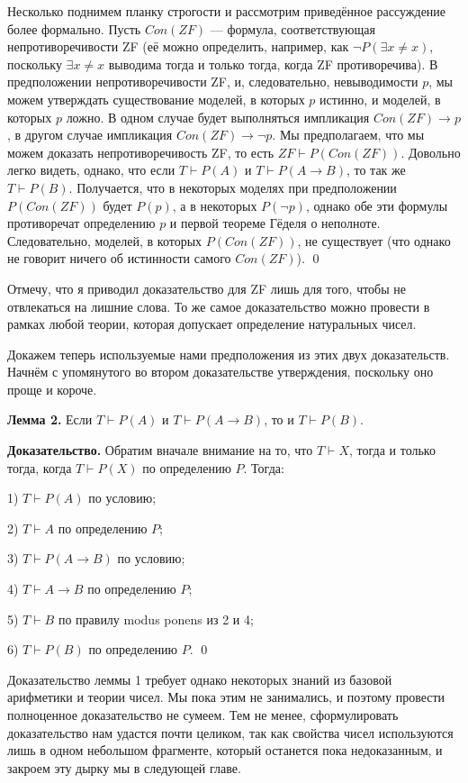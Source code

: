 Несколько поднимем планку строгости и рассмотрим приведённое рассуждение более формально. Пусть $Con(ZF)$ — формула, соответствующая непротиворечивости ZF (её можно определить, например, как $\neg P(\exists x\not=x)$, поскольку $\exists x \not= x$ выводима тогда и только тогда, когда ZF противоречива). В предположении непротиворечивости ZF, и, следовательно, невыводимости $p$, мы можем утверждать существование моделей, в которых $p$ истинно, и моделей, в которых $p$ ложно. В одном случае будет выполняться импликация $Con(ZF)\rightarrow p$, в другом случае импликация $Con(ZF)\rightarrow \neg p$. Мы предполагаем, что мы можем доказать непротиворечивость ZF, то есть $ZF\vdash P(Con(ZF))$. Довольно легко видеть, однако, что если $T\vdash P(A)$ и $T\vdash P(A\rightarrow B)$, то так же $T\vdash P(B)$. Получается, что в некоторых моделях при предположении $P(Con(ZF))$ будет $P(p)$, а в некоторых $P(\neg p)$, однако обе эти формулы противоречат определению $p$ и первой теореме Гёделя о неполноте. Следовательно, моделей, в которых $P(Con(ZF))$, не существует (что однако не говорит ничего об истинности самого $Con(ZF)$). \qed

Отмечу, что я приводил доказательство для ZF лишь для того, чтобы не отвлекаться на лишние слова. То же самое доказательство можно провести в рамках любой теории, которая допускает определение натуральных чисел.

Докажем теперь используемые нами предположения из этих двух доказательств. Начнём с упомянутого во втором доказательстве утверждения, поскольку оно проще и короче.

{\bfseries Лемма 2.} Если $T\vdash P(A)$ и $T\vdash P(A\rightarrow B)$, то и $T\vdash P(B)$.

{\bfseries Доказательство.} Обратим вначале внимание на то, что $T\vdash X$, тогда и только тогда, когда $T\vdash P(X)$ по определению $P$. Тогда:

1) $T\vdash P(A)$  по условию;

2) $T\vdash A$ по определению $P$;

3) $T\vdash P(A\rightarrow B)$ по условию;

4) $T\vdash A \rightarrow B$ по определению $P$;

5) $T\vdash B$ по правилу modus ponens из 2 и 4;

6) $T\vdash P(B)$ по определению $P$. \qed

Доказательство леммы 1 требует однако некоторых знаний из базовой арифметики и теории чисел. Мы пока этим не занимались, и поэтому провести полноценное доказательство не сумеем. Тем не менее, сформулировать доказательство нам удастся почти целиком, так как свойства чисел используются лишь в одном небольшом фрагменте, который останется пока недоказанным, и закроем эту дырку мы в следующей главе.

